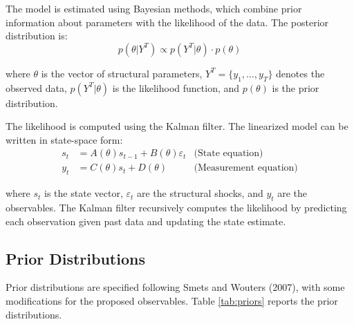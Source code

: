 \documentclass[12pt]{article}
\begin{document}
The model is estimated using Bayesian methods, which combine prior information about parameters with the likelihood of the data. The posterior distribution is:
\begin{equation}
p(\theta|Y^T) \propto p(Y^T|\theta) \cdot p(\theta)
\end{equation}

where $\theta$ is the vector of structural parameters, $Y^T = \{y_1, \ldots, y_T\}$ denotes the observed data, $p(Y^T|\theta)$ is the likelihood function, and $p(\theta)$ is the prior distribution.

The likelihood is computed using the Kalman filter. The linearized model can be written in state-space form:
\begin{align}
s_t &= A(\theta)s_{t-1} + B(\theta)\varepsilon_t & \text{(State equation)} \\
y_t &= C(\theta)s_t + D(\theta) & \text{(Measurement equation)}
\end{align}

where $s_t$ is the state vector, $\varepsilon_t$ are the structural shocks, and $y_t$ are the observables. The Kalman filter recursively computes the likelihood by predicting each observation given past data and updating the state estimate.

\subsection{Prior Distributions}

Prior distributions are specified following Smets and Wouters (2007), with some modifications for the proposed observables. Table \ref{tab:priors} reports the prior distributions.
\end{document}
